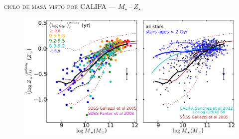 \documentclass[xcolor=dvipsnames,4pt,fleqn,hyperref={colorlinks,citecolor=black,linkcolor=black,urlcolor=black}]{beamer}
\begin{document}
\begin{frame}{\textsc{ciclo de masa visto por CALIFA --- $M_\star\,$--$\,Z_\star$}}

\begin{figure}
\flushleft\citep{Gonzalez2014b}
\includegraphics[scale=0.7]{img/gonzalez2014b-1}
\end{figure}
\end{frame}
\end{document}
